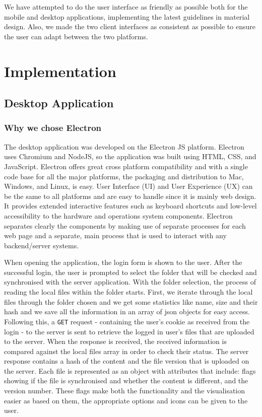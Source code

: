 \documentclass[11pt]{article}
\begin{document}
We have attempted to do the user interface as friendly as possible both for the mobile and desktop applications, implementing the latest guidelines in material design. Also, we made the two client interfaces as consistent as possible to ensure the user can adapt between the two platforms.


\section{Implementation}

\subsection{Desktop Application}

\subsubsection*{Why we chose Electron}

The desktop application was developed on the Electron JS platform. Electron uses Chromium and NodeJS, so the application was built using HTML, CSS, and JavaScript. Electron offers great cross platform compatibility and with a single code base for all the major platforms, the packaging and distribution to Mac, Windows, and Linux, is easy. User Interface (UI) and User Experience (UX) can be the same to all platforms and are easy to handle since it is mainly web design. It provides extended interactive features such as keyboard shortcuts and low-level accessibility to the hardware and operations system components. Electron separates clearly the components by making use of separate processes for each web page and a separate, main process that is used to interact with any backend/server systems.

When opening the application, the login form is shown to the user. After the successful login, the user is prompted to select the folder that will be checked and synchronised with the server application. With the folder selection, the process of reading the local files within the folder starts. First, we iterate through the local files through the folder chosen and we get some statistics like name, size and their hash and we save all the information in an array of json objects for easy access. Following this, a {\tt GET} request - containing the user's cookie as received from the login - to the server is sent to retrieve the logged in user's files that are uploaded to the server. When the response is received, the received information is compared against the local files array in order to check their status. The server response contains a hash of the content and the file version that is uploaded on the server. Each file is represented as an object with attributes that include: flags showing if the file is synchronised and whether the content is different, and the version number. These flags make both the functionality and the visualisation easier as based on them, the appropriate options and icons can be given to the user.
\end{document}
